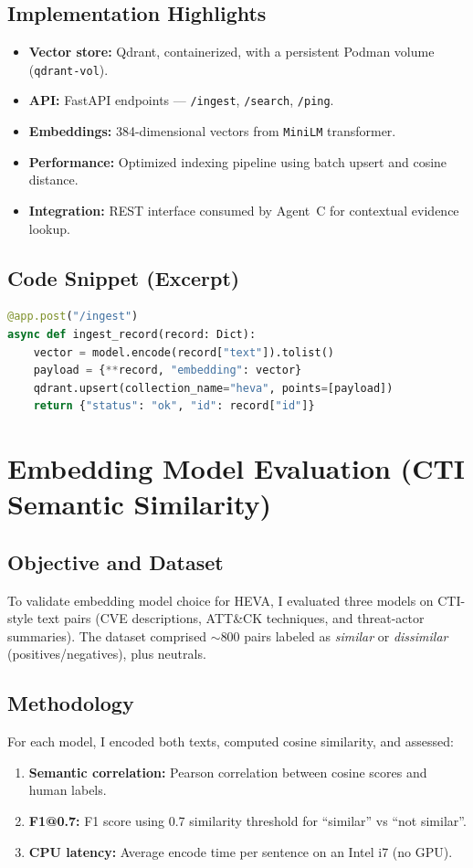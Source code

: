 \documentclass[12pt,a4paper]{article}
\begin{document}
\subsection{Implementation Highlights}
\begin{itemize}[noitemsep]
    \item \textbf{Vector store:} Qdrant, containerized, with a persistent Podman volume (\texttt{qdrant-vol}).
    \item \textbf{API:} FastAPI endpoints — \texttt{/ingest}, \texttt{/search}, \texttt{/ping}.
    \item \textbf{Embeddings:} 384-dimensional vectors from \texttt{MiniLM} transformer.
    \item \textbf{Performance:} Optimized indexing pipeline using batch upsert and cosine distance.
    \item \textbf{Integration:} REST interface consumed by Agent~C for contextual evidence lookup.
\end{itemize}

\subsection{Code Snippet (Excerpt)}
\begin{lstlisting}[language=Python, caption={HEVA ingestion endpoint (excerpt)}]
@app.post("/ingest")
async def ingest_record(record: Dict):
    vector = model.encode(record["text"]).tolist()
    payload = {**record, "embedding": vector}
    qdrant.upsert(collection_name="heva", points=[payload])
    return {"status": "ok", "id": record["id"]}
\end{lstlisting}

\section{Embedding Model Evaluation (CTI Semantic Similarity)}
\label{sec:embedding-eval}
\subsection{Objective and Dataset}
To validate embedding model choice for HEVA, I evaluated three models on CTI-style text pairs (CVE descriptions, ATT\&CK techniques, and threat-actor summaries). The dataset comprised $\sim$800 pairs labeled as \emph{similar} or \emph{dissimilar} (positives/negatives), plus neutrals.

\subsection{Methodology}
For each model, I encoded both texts, computed cosine similarity, and assessed:
\begin{enumerate}[noitemsep]
  \item \textbf{Semantic correlation:} Pearson correlation between cosine scores and human labels.
  \item \textbf{F1@0.7:} F1 score using 0.7 similarity threshold for ``similar'' vs ``not similar''.
  \item \textbf{CPU latency:} Average encode time per sentence on an Intel i7 (no GPU).
\end{enumerate}
\end{document}
